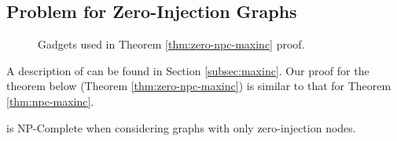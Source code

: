 \subsection{\maxinc Problem for Zero-Injection Graphs}
\label{subsec:zero-maxinc}

\begin{figure}[t]
  \begin{center}
  \end{center}
	\caption{Gadgets used in Theorem \ref{thm:zero-npc-maxinc} proof.}
  \label{fig:zero-maxinc}
\end{figure}

A description of \maxinc can be found in Section \ref{subsec:maxinc}.  Our proof for the theorem below (Theorem \ref{thm:zero-npc-maxinc}) is similar to that for Theorem \ref{thm:npc-maxinc}.
\begin{theorem}
\maxinc is NP-Complete when considering graphs with only zero-injection nodes.  %
\label{thm:zero-npc-maxinc}
\end{theorem}

